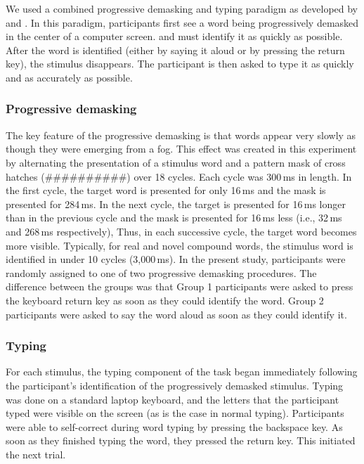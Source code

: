 \documentclass[output=paper]{langsci/langscibook}
\begin{document}
We used a combined progressive demasking and typing paradigm as developed by \citet{LibbenEtAl2012} and \citet{LibbenWeber2014}. In this paradigm, participants first see a word being progressively demasked in the center of a computer screen. and must identify it as quickly as possible. After the word is identified (either by saying it aloud or by pressing the return key), the stimulus disappears. The participant is then asked to type it as quickly and as accurately as possible. 


\subsubsection{Progressive demasking}\label{sec:libben:2.3.1}

The key feature of the progressive demasking is that words appear very slowly as though they were emerging from a fog.  This effect was created in this experiment by alternating the presentation of a stimulus word and a pattern mask of cross hatches (\#\#\#\#\#\#\#\#\#\#) over 18 cycles. Each cycle was 300\,ms in length.  In the first cycle, the target word is presented for only 16\,ms and the mask is presented for 284\,ms. In the next cycle, the target is presented for 16\,ms longer than in the previous cycle and the mask is presented for 16\,ms less (i.e., 32\,ms and 268\,ms respectively), Thus, in each successive cycle, the target word becomes more visible.  Typically, for real and novel compound words, the stimulus word is identified in under 10 cycles (3,000\,ms). In the present study, participants were randomly assigned to one of two progressive demasking procedures. The difference between the groups was that Group 1 participants were asked to press the keyboard return key as soon as they could identify the word. Group 2 participants were asked to say the word aloud as soon as they could identify it.

\subsubsection{Typing}\label{sec:libben:2.3.2}

For each stimulus, the typing component of the task began immediately following the participant’s identification of the progressively demasked stimulus.  Typing was done on a standard laptop keyboard, and the letters that the participant typed were visible on the screen (as is the case in normal typing).  Participants were able to self-correct during word typing by pressing the backspace key. As soon as they finished typing the word, they pressed the return key. This initiated the next trial.
\end{document}
